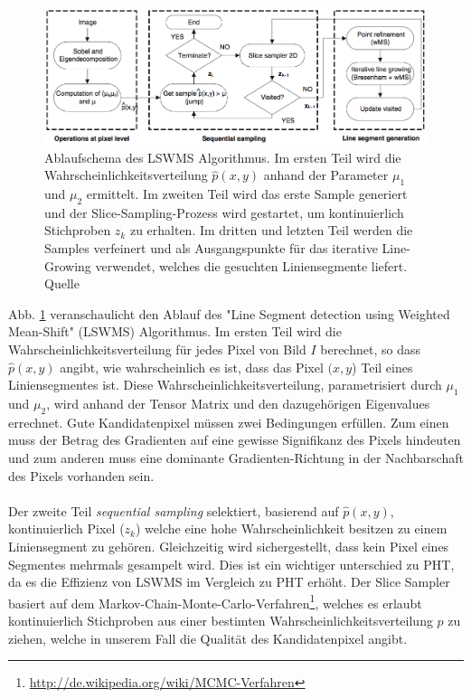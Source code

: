 \begin{figure}[!ht]
\centering
\includegraphics[width=\textwidth]{images/lswms} 
\caption{Ablaufschema des LSWMS Algorithmus. Im ersten Teil wird die Wahrscheinlichkeitsverteilung $\hat{p}(x,y)$ anhand der Parameter $\mu_1$ und $\mu_2$ ermittelt. Im zweiten Teil wird das erste Sample generiert und der Slice-Sampling-Prozess wird gestartet, um kontinuierlich Stichproben $z_k$ zu erhalten. Im dritten und letzten Teil werden die Samples verfeinert und als Ausgangspunkte für das iterative Line-Growing verwendet, welches die gesuchten Liniensegmente liefert. Quelle \cite{nieto}}
\label{fig:lswms}
\end{figure}
\noindent
Abb. \ref{fig:lswms} veranschaulicht den Ablauf des "Line Segment detection using Weighted Mean-Shift" (LSWMS) Algorithmus. Im ersten Teil wird die Wahrscheinlichkeitsverteilung für jedes Pixel von Bild $I$ berechnet, so dass $\hat{p}(x, y)$ angibt, wie wahrscheinlich es ist, dass das Pixel $(x, y$) Teil eines Liniensegmentes ist. Diese Wahrscheinlichkeitsverteilung, parametrisiert durch $\mu_1$ und $\mu_2$, wird anhand der Tensor Matrix und den dazugehörigen Eigenvalues errechnet. Gute Kandidatenpixel müssen zwei Bedingungen erfüllen. Zum einen muss der Betrag des Gradienten auf eine gewisse Signifikanz des Pixels hindeuten und zum anderen muss eine dominante Gradienten-Richtung in der Nachbarschaft des Pixels vorhanden sein.
\paragraph{}
Der zweite Teil \textit{sequential sampling} selektiert, basierend auf $\hat{p}(x,y)$, kontinuierlich Pixel ($z_k$) welche eine hohe Wahrscheinlichkeit besitzen zu einem Liniensegment zu gehören. Gleichzeitig wird sichergestellt, dass kein Pixel eines Segmentes mehrmals gesampelt wird. Dies ist ein wichtiger unterschied zu PHT, da es die Effizienz von LSWMS im Vergleich zu PHT erhöht. Der Slice Sampler basiert auf dem Markov-Chain-Monte-Carlo-Verfahren\footnote{\protect\url{http://de.wikipedia.org/wiki/MCMC-Verfahren}}, welches es erlaubt kontinuierlich Stichproben aus einer bestimten Wahrscheinlichkeitsverteilung $p$ zu ziehen, welche in unserem Fall die Qualität des Kandidatenpixel angibt.
